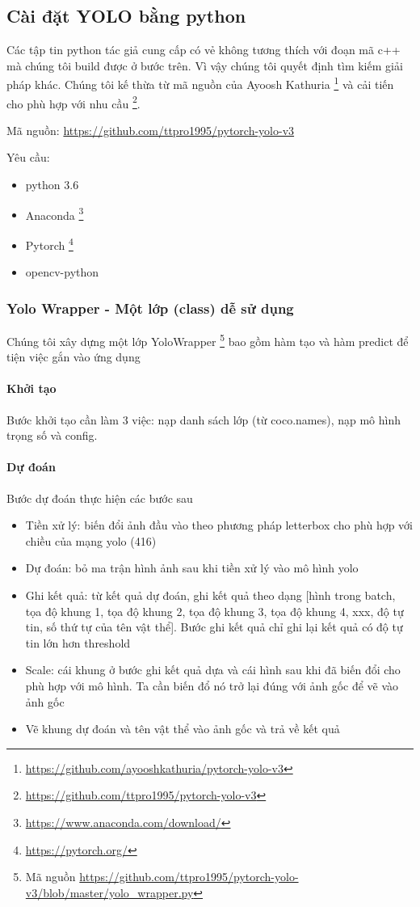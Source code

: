 \subsection{Cài đặt YOLO bằng python}

Các tập tin python tác giả cung cấp có vẻ không tương thích với đoạn mã c++ mà chúng tôi build được ở bước trên. Vì vậy chúng tôi quyết định tìm kiếm giải pháp khác. Chúng tôi kế thừa từ mã nguồn của Ayoosh Kathuria \footnote{\url{https://github.com/ayooshkathuria/pytorch-yolo-v3}} và cải tiến cho phù hợp với nhu cầu \footnote{\url{https://github.com/ttpro1995/pytorch-yolo-v3}}.  

Mã nguồn: \url{https://github.com/ttpro1995/pytorch-yolo-v3}

Yêu cầu: 
\begin{itemize}
\item python 3.6
\item Anaconda \footnote{\url{https://www.anaconda.com/download/}}
\item Pytorch \footnote{\url{https://pytorch.org/}}
\item opencv-python 
\end{itemize}

\subsubsection{Yolo Wrapper - Một lớp (class) dễ sử dụng}

Chúng tôi xây dựng một lớp YoloWrapper \footnote{Mã nguồn \url{https://github.com/ttpro1995/pytorch-yolo-v3/blob/master/yolo_wrapper.py}} bao gồm hàm tạo và hàm predict để tiện việc gắn vào ứng dụng 

\paragraph{Khởi tạo}
Bước khởi tạo cần làm 3 việc: nạp danh sách lớp (từ coco.names), nạp mô hình trọng số và config. 

\paragraph{Dự đoán}
Bước dự đoán thực hiện các bước sau 

\begin{itemize}
\item Tiền xử lý: biến đổi ảnh đầu vào theo phương pháp letterbox cho phù hợp với chiều của mạng yolo (416) 
\item Dự đoán: bỏ ma trận hình ảnh sau khi tiền xử lý vào mô hình yolo 
\item Ghi kết quả: từ kết quả dự đoán, ghi kết quả theo dạng [hình trong batch, tọa độ khung 1, tọa độ khung 2, tọa độ khung 3, tọa độ khung 4, xxx, độ tự tin, số thứ tự của tên vật thể]. Bước ghi kết quả chỉ ghi lại kết quả có độ tự tin lớn hơn threshold 
\item Scale: cái khung ở bước ghi kết quả dựa và cái hình sau khi đã biến đổi cho phù hợp với mô hình. Ta cần biến đổ nó trở lại đúng với ảnh gốc để vẽ vào ảnh gốc 
\item Vẽ khung dự đoán và tên vật thể vào ảnh gốc và trả về kết quả 
\end{itemize} 


